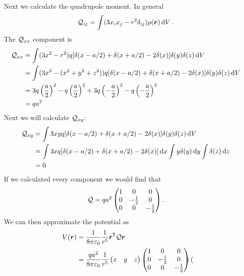 \begin{example}
        Next we calculate the quadrupole moment.
        In general
        \[\mathcal{Q}_{ij} = \int(3x_ix_j - r^2\delta_{ij})\rho(\bm{r})\dd{V}.\]
        The \(\mathcal{Q}_{xx}\) component is
        \begin{align*}
            \mathcal{Q}_{xx} &= \int(3x^2 - r^2)q[\delta(x - a/2) + \delta(x + a/2) - 2\delta(x)]\delta(y) \delta(z)\dd{V}\\
            &= \int(3x^2 - (x^2 + y^2 + z^2))q[\delta(x - a/2) + \delta(x + a/2) - 2\delta(x)]\delta(y) \delta(z)\dd{V}\\
            &= 3q\left(\frac{a}{2}\right)^2 - q\left(\frac{a}{2}\right)^2 + 3q\left(-\frac{a}{2}\right)^2 - q\left(-\frac{a}{2}\right)^2\\
            &= qa^2
        \end{align*}
        Next we will calculate \(\mathcal{Q}_{xy}\):
        \begin{align*}
            \mathcal{Q}_{xy} &= \int 3xyq[\delta(x - a/2) + \delta(x + a/2) - 2\delta(x)]\delta(y) \delta(z)\dd{V}\\
            &= \int 3xq[\delta(x - a/2) + \delta(x + a/2) - 2\delta(x)]\dd{x}\int y\delta(y)\dd{y} \int\delta(z)\dd{z}\\
            &= 0
        \end{align*}
        If we calculated every component we would find that
        \[
            \mathcal{Q} = qa^2
            \begin{pmatrix}
                1 & 0 & 0\\
                0 & -\frac{1}{2} & 0\\
                0 & 0 & -\frac{1}{2}
            \end{pmatrix}
            .
        \]
        We can then approximate the potential as
        \begin{align*}
            V(\bm{r}) &= \frac{1}{8\pi\varepsilon_0} \frac{1}{r^5}\bm{r}^{\mkern-1.5mu\mathsf{T}}\mathcal{Q}\bm{r}\\
            &= \frac{qa^2}{8\pi\varepsilon_0}\frac{1}{r^5}
            \begin{pmatrix}
                x & y & z
            \end{pmatrix}
            \begin{pmatrix}
                1 & 0 & 0\\
                0 & -\frac{1}{2} & 0\\
                0 & 0 & -\frac{1}{2}
            \end{pmatrix}
            \begin{pmatrix}

\end{pmatrix}
\end{align*}
\end{example}
